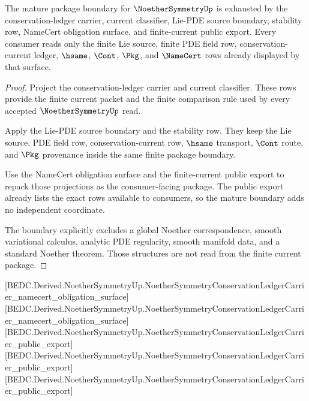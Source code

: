 \begin{theorem}
\label{thm:noethersymmetry-mature-finite-current-boundary}
The mature package boundary for $\NoetherSymmetryUp$ is exhausted by the
conservation-ledger carrier, current classifier, Lie-PDE source boundary,
stability row, NameCert obligation surface, and finite-current public export.
Every consumer reads only the finite Lie source, finite PDE field row,
conservation-current ledger, $\hsame$, $\Cont$, $\Pkg$, and $\NameCert$ rows
already displayed by that surface.
\end{theorem}
\begin{proof}
Project the conservation-ledger carrier and current classifier. These rows
provide the finite current packet and the finite comparison rule used by every
accepted $\NoetherSymmetryUp$ read.

Apply the Lie-PDE source boundary and the stability row. They keep the Lie
source, PDE field row, conservation-current row, $\hsame$ transport,
$\Cont$ route, and $\Pkg$ provenance inside the same finite package boundary.

Use the NameCert obligation surface and the finite-current public export to
repack those projections as the consumer-facing package. The public export
already lists the exact rows available to consumers, so the mature boundary
adds no independent coordinate.

The boundary explicitly excludes a global Noether correspondence, smooth
variational calculus, analytic PDE regularity, smooth manifold data, and a
standard Noether theorem. Those structures are not read from the finite
current package.
\end{proof}

[BEDC.Derived.NoetherSymmetryUp.NoetherSymmetryConservationLedgerCarrier\_namecert\_obligation\_surface]
[BEDC.Derived.NoetherSymmetryUp.NoetherSymmetryConservationLedgerCarrier\_namecert\_obligation\_surface]
[BEDC.Derived.NoetherSymmetryUp.NoetherSymmetryConservationLedgerCarrier\_public\_export]
[BEDC.Derived.NoetherSymmetryUp.NoetherSymmetryConservationLedgerCarrier\_public\_export]
[BEDC.Derived.NoetherSymmetryUp.NoetherSymmetryConservationLedgerCarrier\_public\_export]

